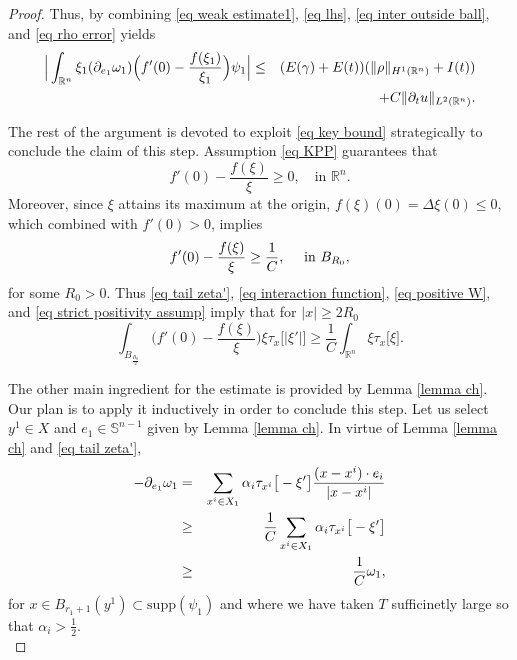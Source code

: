 \documentclass[11pt,letterpaper,reqno]{amsart}
\newcommand{\R}{\mathbb{R}}
\theoremstyle{plain}%
\theoremstyle{definition}
\numberwithin{equation}{section}
\numberwithin{figure}{section}
\begin{document}
\begin{proof}
Thus, by combining  \eqref{eq weak estimate1},  \eqref{eq lhs}, \eqref{eq inter outside ball}, and \eqref{eq rho error} yields
\begin{eqnarray}\notag
\Big| \int_{\R^n} \xi_1 (\partial_{e_1}  \omega_{1} )\Big( f'(0) -\frac{f(\xi_1)}{\xi_1}\Big)  \psi_1\Big| &\leq& (E(\gamma)+E(t))(\Vert \rho\Vert_{H^1(\R^n)} + I(t))\\\label{eq key bound}
&&+C\Vert \partial_t u\Vert_{L^2(\R^n)}.
\end{eqnarray}

The rest of the argument is devoted to exploit \eqref{eq key bound} strategically to conclude the claim of this step. Assumption \eqref{eq KPP} guarantees that
\begin{equation}\label{eq positive W}
	f'(0) -\frac{f(\xi)}{\xi}  	\geq 0, \quad \mbox{in $\R^n$}.
\end{equation}
Moreover, since $\xi$ attains its maximum at the origin, $f(\xi)(0)=\Delta \xi(0)\leq 0$, which combined with $f'(0)>0$, implies
\begin{equation}\label{eq strict positivity assump}
 f'(0) -\frac{f(\xi)}{\xi} \geq \frac{1}{C}, \quad \mbox{ in $ B_{R_0}$},
\end{equation}
for some $R_0>0$. Thus \eqref{eq tail zeta'}, \eqref{eq interaction function}, \eqref{eq positive W}, and  \eqref{eq strict positivity assump} imply that for $|x| \geq 2R_0$
\begin{equation}\label{eq interaction ls}
	\int_{B_\frac{R_0}{2}}\Big(f'(0) -\frac{f(\xi)}{\xi}\Big)\xi \tau_{x}\big[|\xi'|\big] \geq 	\frac{1}{C}\int_{\R^n}\xi \tau_{x}\big[\xi\big] .
\end{equation}

The other main ingredient for the estimate is provided by Lemma \ref{lemma ch}. Our plan is to apply it inductively in order to conclude this step. Let us select $y^1 \in X$ and $e_1 \in \mathbb{S}^{n-1}$ given by Lemma \ref{lemma ch}. In virtue of Lemma \ref{lemma ch} and \eqref{eq tail zeta'}, 
\begin{eqnarray}\notag
	-\partial_{e_1} \omega_1 &=&  \sum_{x^i \in X_{1}} \alpha_i \tau_{x^i}\big[-\xi'\big] \frac{(x-x^i)\cdot e_i}{|x-x^i|}\\\notag	
	 &\geq& \frac{1}{C}\sum_{x^i \in X_{1}} \alpha_i \tau_{x^i}\big[-\xi'\big]\\\label{eq derivative far bubbles}
	 &\geq& \frac{1}{C }\omega_1,
\end{eqnarray}
for $x\in B_{r_1+1}(y^1)\subset \text{supp}(\psi_1)$ and where we have taken $T$ sufficinetly large so that $\alpha_i>\frac{1}{2}$. \\


\end{proof}
\end{document}
